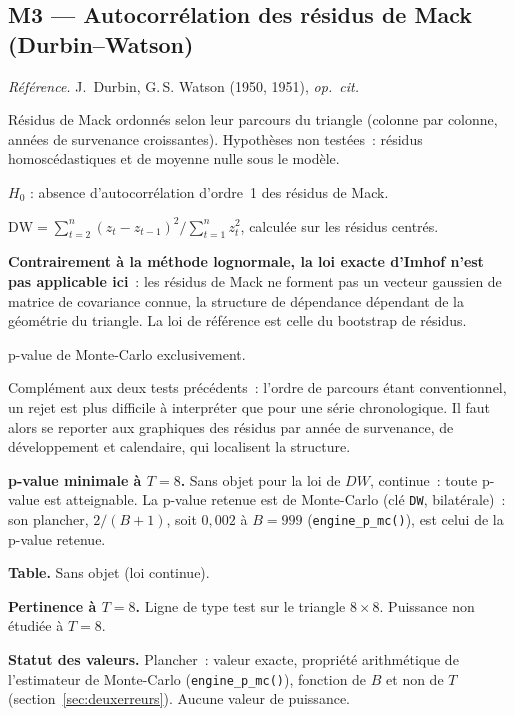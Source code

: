 \documentclass[a4paper,11pt]{article}
\newcommand{\code}[1]{\texttt{\small #1}}
\newcommand{\refl}[1]{{\small\textcolor{maincolor!70!black}{\textit{Référence.} #1}}\par\smallskip}
\newcounter{ficheid}
\newenvironment{fiche}[1]{%
  \stepcounter{ficheid}%
  \phantomsection
  \subsection{#1}%
  \label{fiche:\theficheid}%
}{%
  \end{description}\vspace{0.5em}%
}
\newcommand{\Cadre}{%
  \begin{description}[leftmargin=0pt, style=unboxed, itemsep=3pt, topsep=3pt, parsep=2pt]%
  \item[\textcolor{financeblue}{\textbf{1. Cadre, notations et hypothèses de validité (non testées).}}]}
\newcommand{\Hzero}{\item[\textcolor{financeblue}{\textbf{2. Hypothèse nulle.}}]}
\newcommand{\Stat}{\item[\textcolor{financeblue}{\textbf{3. Statistique de test.}}]}
\newcommand{\Loi}{\item[\textcolor{financeblue}{\textbf{4. Loi sous $H_0$.}}]}
\newcommand{\Pval}{\item[\textcolor{financeblue}{\textbf{5. p-value.}}]}
\newcommand{\Usage}{\item[\textcolor{financeblue}{\textbf{6. Usage et limites.}}]}
\newcommand{\Pertinence}{\item[\textcolor{financeblue}{\textbf{7. Pertinence et puissance à faible $T$.}}]}
\begin{document}
\begin{fiche}{M3 --- Autocorrélation des résidus de Mack (Durbin--Watson)}
\label{mw:m3dw}
\refl{J.~Durbin, G.\,S. Watson (1950, 1951), \emph{op.\ cit.}}
\Cadre
Résidus de Mack ordonnés selon leur parcours du triangle (colonne par colonne,
années de survenance croissantes). Hypothèses non testées~: résidus
homoscédastiques et de moyenne nulle sous le modèle.
\Hzero
$H_0$ : absence d'autocorrélation d'ordre~1 des résidus de Mack.
\Stat
$\mathrm{DW} = \sum_{t=2}^{n}(z_t - z_{t-1})^2 / \sum_{t=1}^{n} z_t^2$, calculée
sur les résidus centrés.
\Loi
\textbf{Contrairement à la méthode lognormale, la loi exacte d'Imhof n'est pas
applicable ici}~: les résidus de Mack ne forment pas un vecteur gaussien de
matrice de covariance connue, la structure de dépendance dépendant de la
géométrie du triangle. La loi de référence est celle du bootstrap de résidus.
\Pval
p-value de Monte-Carlo exclusivement.
\Usage
Complément aux deux tests précédents~: l'ordre de parcours étant conventionnel,
un rejet est plus difficile à interpréter que pour une série chronologique. Il
faut alors se reporter aux graphiques des résidus par année de survenance, de
développement et calendaire, qui localisent la structure.
\Pertinence
\textbf{p-value minimale à $T = 8$.} Sans objet pour la loi de $DW$, continue~: toute p-value est atteignable. La p-value retenue est de Monte-Carlo (clé \code{DW}, bilatérale)~: son plancher, $2/(B+1)$, soit $0{,}002$ à $B = 999$ (\code{engine\_p\_mc()}), est celui de la p-value retenue.

\textbf{Table.} Sans objet (loi continue).

\textbf{Pertinence à $T = 8$.} Ligne de type test sur le triangle $8\times 8$. Puissance non étudiée à $T = 8$.

\textbf{Statut des valeurs.} Plancher~: valeur exacte, propriété arithmétique de l'estimateur de Monte-Carlo (\code{engine\_p\_mc()}), fonction de $B$ et non de $T$ (section~\ref{sec:deuxerreurs}). Aucune valeur de puissance.
\end{fiche}
\end{document}
